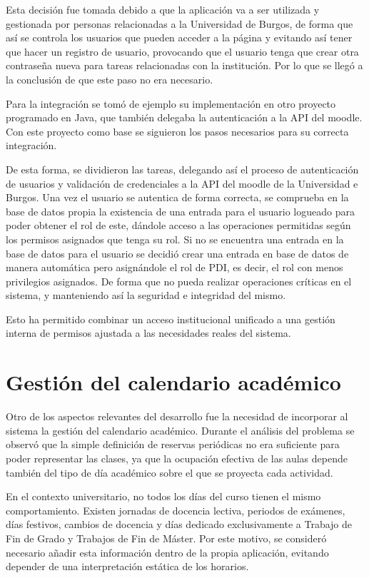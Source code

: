 Esta decisión fue tomada debido a que la aplicación va a ser utilizada y gestionada por personas relacionadas a la Universidad de Burgos, de forma que así se controla los usuarios que pueden acceder a la página y evitando así tener que hacer un registro de usuario, provocando que el usuario tenga que crear otra contraseña nueva para tareas relacionadas con la institución. Por lo que se llegó a la conclusión de que este paso no era necesario.

Para la integración se tomó de ejemplo su implementación en otro proyecto programado en Java, que también delegaba la autenticación a la API del moodle. Con este proyecto como base se siguieron los pasos necesarios para su correcta integración.

De esta forma, se dividieron las tareas, delegando así el proceso de autenticación de usuarios y validación de credenciales a la API del moodle de la Universidad e Burgos. Una vez el usuario se autentica de forma correcta, se comprueba en la base de datos propia la existencia de una entrada para el usuario logueado para poder obtener el rol de este, dándole acceso a las operaciones permitidas según los permisos asignados que tenga su rol. Si no se encuentra una entrada en la base de datos para el usuario se decidió crear una entrada en base de datos de manera automática pero asignándole el rol de PDI, es decir, el rol con menos privilegios asignados. De forma que no pueda realizar operaciones críticas en el sistema, y manteniendo así la seguridad e integridad del mismo.

Esto ha permitido combinar un acceso institucional unificado a una gestión interna de permisos ajustada a las necesidades reales del sistema.

\section{Gestión del calendario académico}

Otro de los aspectos relevantes del desarrollo fue la necesidad de incorporar al sistema la gestión del calendario académico. Durante el análisis del problema se observó que la simple definición de reservas periódicas no era suficiente para poder representar las clases, ya que la ocupación efectiva de las aulas depende también del tipo de día académico sobre el que se proyecta cada actividad.

En el contexto universitario, no todos los días del curso tienen el mismo comportamiento. Existen jornadas de docencia lectiva, periodos de exámenes, días festivos, cambios de docencia y días dedicado exclusivamente a Trabajo de Fin de Grado y Trabajos de Fin de Máster. Por este motivo, se consideró necesario añadir esta información dentro de la propia aplicación, evitando depender de una interpretación estática de los horarios.

